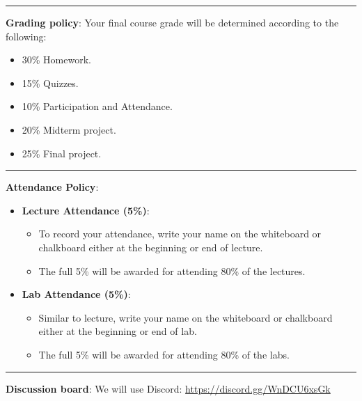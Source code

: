 \documentclass[12pt]{article}
\begin{document}
\begin{center}
  \rule{\textwidth}{0.5pt}
\end{center}

\noindent\textbf{Grading policy}: Your final course grade will be determined according to the following:
\begin{itemize}
  \item 30\% Homework.
  \item 15\% Quizzes.
  \item 10\% Participation and Attendance.
  \item 20\% Midterm project.
  \item 25\% Final project.
\end{itemize}

\begin{center}
  \rule{\textwidth}{0.5pt}
\end{center}

\noindent\textbf{Attendance Policy}:

\begin{itemize}
  \item \textbf{Lecture Attendance (5\%)}:
    \begin{itemize}
      \item To record your attendance, write your name on the whiteboard or chalkboard either at the beginning or end of lecture.
      \item The full 5\% will be awarded for attending 80\% of the lectures.
    \end{itemize}
  
  \item \textbf{Lab Attendance (5\%)}:
    \begin{itemize}
      \item Similar to lecture, write your name on the whiteboard or chalkboard either at the beginning or end of lab.
      \item The full 5\% will be awarded for attending 80\% of the labs.
    \end{itemize}
\end{itemize}


\begin{center}
  \rule{\textwidth}{0.5pt}
\end{center}

\noindent\textbf{Discussion board}: We will use Discord: \href{https://discord.gg/WnDCU6xsGk}{https://discord.gg/WnDCU6xsGk}
\end{document}
